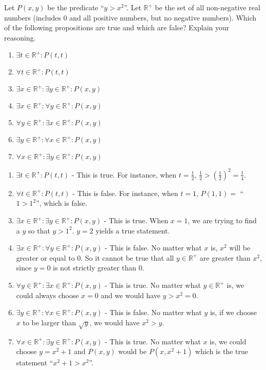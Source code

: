 \begin{xca}
	Let $P(x,y)$ be the predicate ``$y >  x^2$''. Let $\mathbb{R}^+$ be the set of all non-negative real numbers (includes $0$ and all positive numbers, but no negative numbers).  Which of the following propositions are true and which are false?  Explain your reasoning.
	
	\begin{enumerate}
			\item $\exists t \in \mathbb{R}^+: P(t,t)$
			\item $\forall t \in \mathbb{R}^+: P(t,t)$
			\item$\exists x \in \mathbb{R}^+: \exists y\in \mathbb{R}^+: P(x,y)$
			\item $\exists x \in \mathbb{R}^+: \forall y \in \mathbb{R}^+: P(x,y)$
			\item $\forall y \in \mathbb{R}^+: \exists x \in \mathbb{R}^+: P(x,y)$
			\item $\exists y \in \mathbb{R}^+: \forall x \in \mathbb{R}^+: P(x,y)$
			\item $\forall x \in \mathbb{R}^+: \exists y \in \mathbb{R}^+: P(x,y)$
		\end{enumerate}
	\end{xca}

\begin{solutions}
			\begin{enumerate}
			\item $\exists t \in \mathbb{R}^+: P(t,t)$ - This is true.  For instance, when $t = \frac{1}{2}$, $\frac{1}{2} > (\frac{1}{2})^2  =\frac{1}{4}$.
			\item $\forall t \in \mathbb{R}^+: P(t,t)$ - This is false.  For instance, when $ t= 1$, $P(1,1) = $ ``$1 > 1^2$'', which is false.  
			\item$\exists x \in \mathbb{R}^+: \exists y\in \mathbb{R}^+: P(x,y)$ - This is true.  When $x = 1$, we are trying to find a $y$ so that $y > 1^2$.  $y = 2$ yields a true statement.
			\item $\exists x \in \mathbb{R}^+: \forall y \in \mathbb{R}^+: P(x,y)$ - This is false.  No matter what $x$ is, $x^2$ will be greater or equal to $0$.  So it cannot be true that all $y \in \mathbb{R}^+$ are greater than $x^2$, since $y = 0$ is not strictly greater than $0$.
			\item $\forall y \in \mathbb{R}^+: \exists x \in \mathbb{R}^+: P(x,y)$ - This is true.  No matter what $y \in \mathbb{R}^+$ is, we could always choose $x = 0$ and we would have $y > x^2 = 0$.
			\item $\exists y \in \mathbb{R}^+: \forall x \in \mathbb{R}^+: P(x,y)$ - This is false.  No matter what $y$ is, if we choose $x$ to be larger than $\sqrt{y}$, we would have $x^2 > y$.
			\item $\forall x \in \mathbb{R}^+: \exists y \in \mathbb{R}^+: P(x,y)$ - This is true.  No matter what $x$ is, we could choose $y = x^2+1$ and $P(x,y)$ would be $P(x,x^2+1)$ which is the true statement ``$x^2+1 > x^2$''.
		\end{enumerate}
	\end{solutions}


